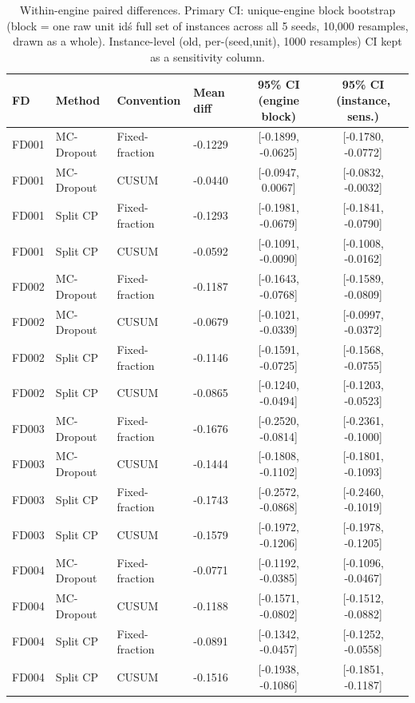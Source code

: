 \begin{table}[t]
\caption{Within-engine paired differences. Primary CI: unique-engine block bootstrap (block = one raw unit id\'s full set of instances across all 5 seeds, 10{,}000 resamples, drawn as a whole). Instance-level (old, per-(seed,unit), 1000 resamples) CI kept as a sensitivity column.}
\label{tab:paired-diff-v2}
\centering
\small
\begin{tabular}{llllcc}
\toprule
FD & Method & Convention & Mean diff & 95\% CI (engine block) & 95\% CI (instance, sens.) \\
\midrule
FD001 & MC-Dropout & Fixed-fraction & -0.1229 & [-0.1899, -0.0625] & [-0.1780, -0.0772] \\
FD001 & MC-Dropout & CUSUM & -0.0440 & [-0.0947, 0.0067] & [-0.0832, -0.0032] \\
FD001 & Split CP & Fixed-fraction & -0.1293 & [-0.1981, -0.0679] & [-0.1841, -0.0790] \\
FD001 & Split CP & CUSUM & -0.0592 & [-0.1091, -0.0090] & [-0.1008, -0.0162] \\
FD002 & MC-Dropout & Fixed-fraction & -0.1187 & [-0.1643, -0.0768] & [-0.1589, -0.0809] \\
FD002 & MC-Dropout & CUSUM & -0.0679 & [-0.1021, -0.0339] & [-0.0997, -0.0372] \\
FD002 & Split CP & Fixed-fraction & -0.1146 & [-0.1591, -0.0725] & [-0.1568, -0.0755] \\
FD002 & Split CP & CUSUM & -0.0865 & [-0.1240, -0.0494] & [-0.1203, -0.0523] \\
FD003 & MC-Dropout & Fixed-fraction & -0.1676 & [-0.2520, -0.0814] & [-0.2361, -0.1000] \\
FD003 & MC-Dropout & CUSUM & -0.1444 & [-0.1808, -0.1102] & [-0.1801, -0.1093] \\
FD003 & Split CP & Fixed-fraction & -0.1743 & [-0.2572, -0.0868] & [-0.2460, -0.1019] \\
FD003 & Split CP & CUSUM & -0.1579 & [-0.1972, -0.1206] & [-0.1978, -0.1205] \\
FD004 & MC-Dropout & Fixed-fraction & -0.0771 & [-0.1192, -0.0385] & [-0.1096, -0.0467] \\
FD004 & MC-Dropout & CUSUM & -0.1188 & [-0.1571, -0.0802] & [-0.1512, -0.0882] \\
FD004 & Split CP & Fixed-fraction & -0.0891 & [-0.1342, -0.0457] & [-0.1252, -0.0558] \\
FD004 & Split CP & CUSUM & -0.1516 & [-0.1938, -0.1086] & [-0.1851, -0.1187] \\
\bottomrule
\end{tabular}
\end{table}
